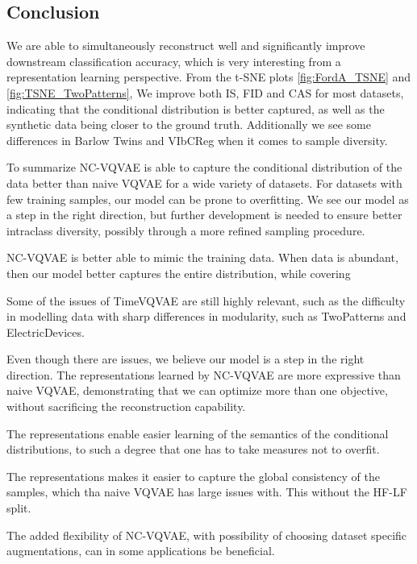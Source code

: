 \documentclass[../../thesis.tex]{subfiles}
\begin{document}
\subsection*{Conclusion}
We are able to simultaneously reconstruct well and significantly improve downstream classification accuracy, which is very interesting from a representation learning perspective. From the t-SNE plots \ref{fig:FordA_TSNE} and \ref{fig:TSNE_TwoPatterns}, 
We improve both IS, FID and CAS for most datasets, indicating that the conditional distribution is better captured, as well as the synthetic data being closer to the ground truth. Additionally we see some differences in Barlow Twins and VIbCReg when it comes to sample diversity.\newline

To summarize NC-VQVAE is able to capture the conditional distribution of the data better than naive VQVAE for a wide variety of datasets. For datasets with few training samples, our model can be prone to overfitting. We see our model as a step in the right direction, but further development is needed to ensure better intraclass diversity, possibly through a more refined sampling procedure. \newline


NC-VQVAE is better able to mimic the training data. When data is abundant, then our model better captures the entire distribution, while covering \newline

Some of the issues of TimeVQVAE are still highly relevant, such as the difficulty in modelling data with sharp differences in modularity, such as TwoPatterns and ElectricDevices.\newline



Even though there are issues, we believe our model is a step in the right direction. The representations learned by NC-VQVAE are more expressive than naive VQVAE, demonstrating that we can optimize more than one objective, without sacrificing the reconstruction capability. 

The representations enable easier learning of the semantics of the conditional distributions, to such a degree that one has to take measures not to overfit. 

The representations makes it easier to capture the global consistency of the samples, which tha naive VQVAE has large issues with. This without the HF-LF split.

The added flexibility of NC-VQVAE, with possibility of choosing dataset specific augmentations, can in some applications be beneficial.\newline
\end{document}
